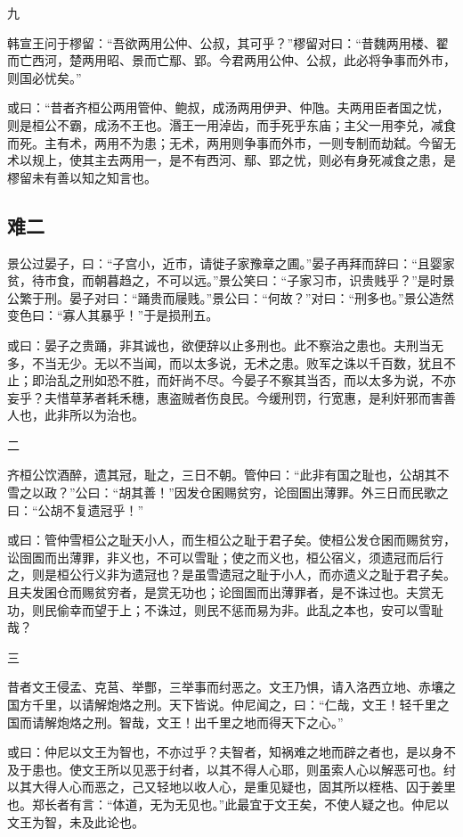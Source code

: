\documentclass[]{article}
\begin{document}
九

韩宣王问于樛留：``吾欲两用公仲、公叔，其可乎？''樛留对曰：``昔魏两用楼、翟而亡西河，楚两用昭、景而亡鄢、郢。今君两用公仲、公叔，此必将争事而外市，则国必忧矣。''

或曰：``昔者齐桓公两用管仲、鲍叔，成汤两用伊尹、仲虺。夫两用臣者国之忧，则是桓公不霸，成汤不王也。湣王一用淖齿，而手死乎东庙；主父一用李兑，减食而死。主有术，两用不为患；无术，两用则争事而外市，一则专制而劫弑。今留无术以规上，使其主去两用一，是不有西河、鄢、郢之忧，则必有身死减食之患，是樛留未有善以知之知言也。

\hypertarget{header-n1516}{%
\subsection{难二}\label{header-n1516}}

景公过晏子，曰：``子宫小，近市，请徙子家豫章之圃。''晏子再拜而辞曰：``且婴家贫，待市食，而朝暮趋之，不可以远。''景公笑曰：``子家习市，识贵贱乎？''是时景公繁于刑。晏子对曰：``踊贵而屦贱。''景公曰：``何故？''对曰：``刑多也。''景公造然变色曰：``寡人其暴乎！''于是损刑五。

或曰：晏子之贵踊，非其诚也，欲便辞以止多刑也。此不察治之患也。夫刑当无多，不当无少。无以不当闻，而以太多说，无术之患。败军之诛以千百数，犹且不止；即治乱之刑如恐不胜，而奸尚不尽。今晏子不察其当否，而以太多为说，不亦妄乎？夫惜草茅者耗禾穗，惠盗贼者伤良民。今缓刑罚，行宽惠，是利奸邪而害善人也，此非所以为治也。

二

齐桓公饮酒醉，遗其冠，耻之，三日不朝。管仲曰：``此非有国之耻也，公胡其不雪之以政？''公曰：``胡其善！''因发仓囷赐贫穷，论囹圄出薄罪。外三日而民歌之曰：``公胡不复遗冠乎！''

或曰：管仲雪桓公之耻天小人，而生桓公之耻于君子矣。使桓公发仓囷而赐贫穷，讼囹圄而出薄罪，非义也，不可以雪耻；使之而义也，桓公宿义，须遗冠而后行之，则是桓公行义非为遗冠也？是虽雪遗冠之耻于小人，而亦遗义之耻于君子矣。且夫发囷仓而赐贫穷者，是赏无功也；论囹圄而出薄罪者，是不诛过也。夫赏无功，则民偷幸而望于上；不诛过，则民不惩而易为非。此乱之本也，安可以雪耻哉？

三

昔者文王侵孟、克莒、举酆，三举事而纣恶之。文王乃惧，请入洛西立地、赤壤之国方千里，以请解炮烙之刑。天下皆说。仲尼闻之，曰：``仁哉，文王！轻千里之国而请解炮烙之刑。智哉，文王！出千里之地而得天下之心。''

或曰：仲尼以文王为智也，不亦过乎？夫智者，知祸难之地而辟之者也，是以身不及于患也。使文王所以见恶于纣者，以其不得人心耶，则虽索人心以解恶可也。纣以其大得人心而恶之，己又轻地以收人心，是重见疑也，固其所以桎梏、囚于姜里也。郑长者有言：``体道，无为无见也。''此最宜于文王矣，不使人疑之也。仲尼以文王为智，未及此论也。
\end{document}
